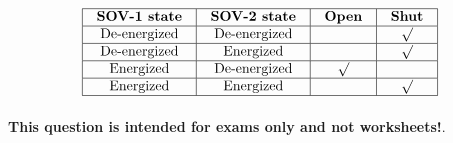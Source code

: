 






$$\vbox{\offinterlineskip
\halign{\strut
\vrule \quad\hfil # \ \hfil & 
\vrule \quad\hfil # \ \hfil & 
\vrule \quad\hfil # \ \hfil & 
\vrule \quad\hfil # \ \hfil \vrule \cr
\noalign{\hrule}
%
{\bf SOV-1 state} & {\bf SOV-2 state} & {\bf Open} & {\bf Shut} \cr
%
\noalign{\hrule}
%
De-energized & De-energized &  & $\surd$ \cr
%
\noalign{\hrule}
%
De-energized & Energized &  & $\surd$ \cr
%
\noalign{\hrule}
%
Energized & De-energized & $\surd$ &  \cr
%
\noalign{\hrule}
%
Energized & Energized &  & $\surd$ \cr
%
\noalign{\hrule}
} %
}$$ %







{\bf This question is intended for exams only and not worksheets!}.


